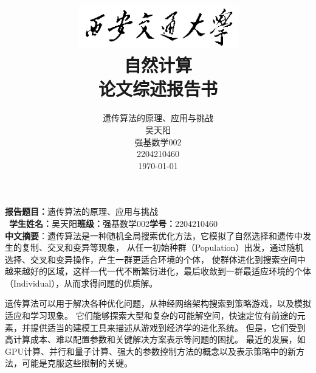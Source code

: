\documentclass[12pt, a4paper, oneside]{ctexart}
\numberwithin{equation}{section}  %
\begin{document}
\title{
    \vspace{2cm}
    \includegraphics[width=7cm]{XJTU_logo}\\[1ex]
    \textbf{自然计算\\[1ex]
    论文综述报告书} \vspace{3cm}
}
\preauthor{\begin{flushleft}\large}
\postauthor{\end{flushleft}}
\author{
    \hspace{3cm}\begin{minipage}[t]{0.65\linewidth}
遗传算法的原理、应用与挑战\\[1ex]
吴天阳\\[1ex]
强基数学002\\[1ex]
2204210460\\[1ex]
\today
    \end{minipage}
}
\date{}
\maketitle %
\thispagestyle{titlestyle}
\clearpage %
\thispagestyle{abstructstyle}
\noindent\textbf{报告题目：}遗传算法的原理、应用与挑战\\\
\textbf{学生姓名：}吴天阳\quad \textbf{班级：}强基数学002\quad \textbf{学号：}2204210460\\

\textbf{中文摘要}：遗传算法是一种随机全局搜索优化方法，它模拟了自然选择和遗传中发生的复制、交叉和变异等现象，
从任一初始种群（Population）出发，通过随机选择、交叉和变异操作，产生一群更适合环境的个体，
使群体进化到搜索空间中越来越好的区域，这样一代一代不断繁衍进化，最后收敛到一群最适应环境的个体（Individual），从而求得问题的优质解。

遗传算法可以用于解决各种优化问题，从神经网络架构搜索到策略游戏，以及模拟适应和学习现象。
它们能够探索大型和复杂的可能解空间，快速定位有前途的元素，并提供适当的建模工具来描述从游戏到经济学的进化系统。
但是，它们受到高计算成本、难以配置参数和关键解决方案表示等问题的困扰。
最近的发展，如GPU计算、并行和量子计算、强大的参数控制方法的概念以及表示策略中的新方法，可能是克服这些限制的关键。
\end{document}

